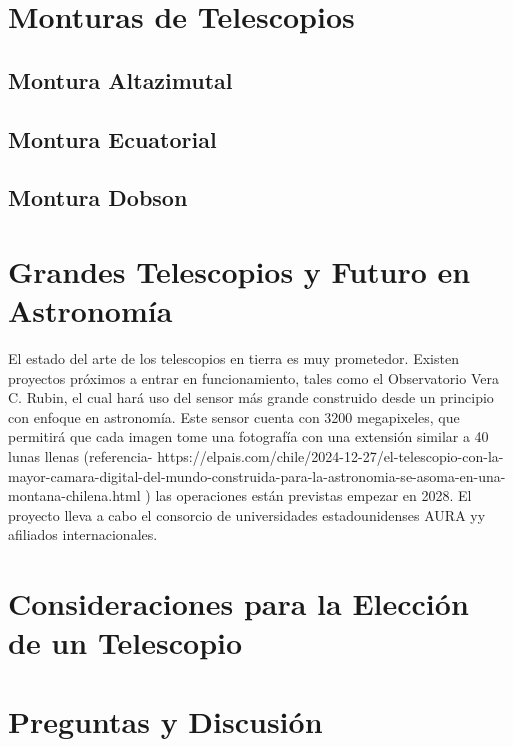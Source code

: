 \section{Monturas de Telescopios}
\subsection{Montura Altazimutal}
\subsection{Montura Ecuatorial}
\subsection{Montura Dobson}

\section{Grandes Telescopios y Futuro en Astronomía}

El estado del arte de los telescopios en tierra es muy prometedor. Existen proyectos próximos a entrar en funcionamiento, tales como el Observatorio Vera C. Rubin, el cual hará uso del sensor más grande construido desde un principio con enfoque en astronomía. Este sensor cuenta con 3200 megapixeles, que permitirá que cada imagen tome una fotografía con una extensión similar a 40 lunas llenas (referencia- https://elpais.com/chile/2024-12-27/el-telescopio-con-la-mayor-camara-digital-del-mundo-construida-para-la-astronomia-se-asoma-en-una-montana-chilena.html ) las operaciones están previstas empezar en 2028. El proyecto lleva a cabo el consorcio de universidades estadounidenses AURA yy afiliados internacionales. 

\section{Consideraciones para la Elección de un Telescopio}

\section{Preguntas y Discusión}
